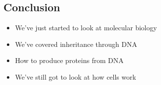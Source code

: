 
\begin{slide}
\section{Conclusion}

\begin{PauseHighLight}
  \begin{itemize}
  \item We've just started to look at molecular biology\pause
  \item We've covered inheritance through DNA\pause
  \item How to produce proteins from DNA\pause
  \item We've still got to look at how cells work\pause
  \end{itemize}
\end{PauseHighLight}

\end{slide}



